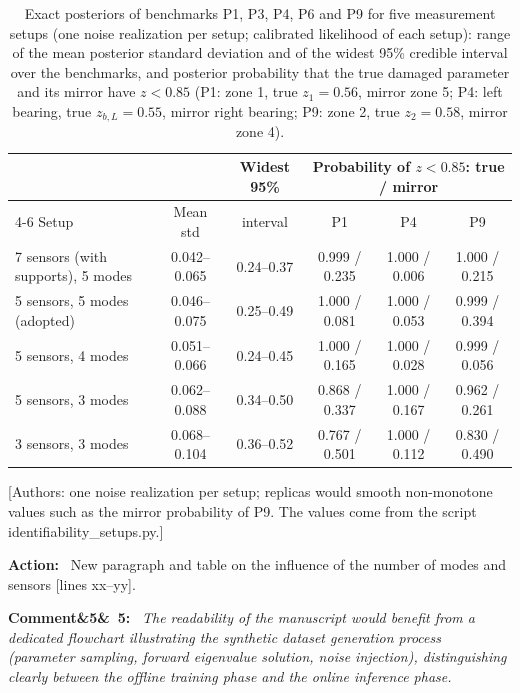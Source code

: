 \documentclass[11pt]{article}
\newenvironment{rcomment}[1]{\par\bigskip\noindent\textbf{Comment\ifx&#1&\else\ #1\fi:}\ \itshape}{\par}
\newenvironment{action}{\par\smallskip\noindent\color{resp}\textbf{Action:}\ }{\par}
\newcommand{\authornote}[1]{\textcolor{note}{\textsf{[Authors: #1]}}}
\newcommand{\tbd}[1]{\textcolor{note}{\textsf{[#1]}}}
\newcommand{\lines}[1]{\tbd{lines #1}}
\begin{document}
\begin{table}[H]
\centering\small
\caption{Exact posteriors of benchmarks P1, P3, P4, P6 and P9 for five measurement setups (one noise realization per
setup; calibrated likelihood of each setup): range of the mean posterior standard deviation and of the widest 95\%
credible interval over the benchmarks, and posterior probability that the true damaged parameter and its mirror have
$z<0.85$ (P1: zone 1, true $z_1=0.56$, mirror zone 5; P4: left bearing, true $z_{b,L}=0.55$, mirror right bearing; P9:
zone 2, true $z_2=0.58$, mirror zone 4).}
\label{tab:modes}
\footnotesize\setlength{\tabcolsep}{4pt}
\begin{tabular}{lccccc}
\toprule
 & & Widest 95\% & \multicolumn{3}{c}{Probability of $z<0.85$: true / mirror} \\
\cmidrule(l){4-6}
Setup & Mean std & interval & P1 & P4 & P9 \\
\midrule
7 sensors (with supports), 5 modes & 0.042--0.065 & 0.24--0.37 & 0.999 / 0.235 & 1.000 / 0.006 & 1.000 / 0.215 \\
5 sensors, 5 modes (adopted) & 0.046--0.075 & 0.25--0.49 & 1.000 / 0.081 & 1.000 / 0.053 & 0.999 / 0.394 \\
5 sensors, 4 modes & 0.051--0.066 & 0.24--0.45 & 1.000 / 0.165 & 1.000 / 0.028 & 0.999 / 0.056 \\
5 sensors, 3 modes & 0.062--0.088 & 0.34--0.50 & 0.868 / 0.337 & 1.000 / 0.167 & 0.962 / 0.261 \\
3 sensors, 3 modes & 0.068--0.104 & 0.36--0.52 & 0.767 / 0.501 & 1.000 / 0.112 & 0.830 / 0.490 \\
\bottomrule
\end{tabular}
\end{table}
\authornote{one noise realization per setup; replicas would smooth non-monotone values such as the mirror probability of
P9. The values come from the script identifiability\_setups.py.}

\begin{action}
New paragraph and table on the influence of the number of modes and sensors \lines{xx--yy}.
\end{action}

\begin{rcomment}{5}
The readability of the manuscript would benefit from a dedicated flowchart illustrating the synthetic dataset
generation process (parameter sampling, forward eigenvalue solution, noise injection), distinguishing clearly between
the offline training phase and the online inference phase.
\end{rcomment}
\end{document}
